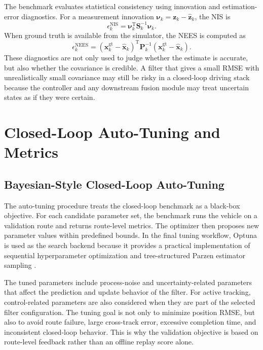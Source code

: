 \documentclass[conference]{IEEEtran}
\begin{document}
The benchmark evaluates statistical consistency using innovation and estimation-error diagnostics. For a measurement innovation $\boldsymbol{\nu}_k=\mathbf{z}_k-\hat{\mathbf{z}}_k$, the NIS is
\begin{equation}
\epsilon_k^{\mathrm{NIS}}=\boldsymbol{\nu}_k^{\mathrm{T}}\mathbf{S}_k^{-1}\boldsymbol{\nu}_k.
\label{eq:nis}
\end{equation}
When ground truth is available from the simulator, the NEES is computed as
\begin{equation}
\epsilon_k^{\mathrm{NEES}}=(\mathbf{x}_k^{\mathrm{gt}}-\hat{\mathbf{x}}_k)^{\mathrm{T}}
\mathbf{P}_k^{-1}(\mathbf{x}_k^{\mathrm{gt}}-\hat{\mathbf{x}}_k).
\label{eq:nees}
\end{equation}
These diagnostics are not only used to judge whether the estimate is accurate, but also whether the covariance is credible. A filter that gives a small RMSE with unrealistically small covariance may still be risky in a closed-loop driving stack because the controller and any downstream fusion module may treat uncertain states as if they were certain.

\section{Closed-Loop Auto-Tuning and Metrics}
\label{sec:tuning_metrics}

\subsection{Bayesian-Style Closed-Loop Auto-Tuning}

The auto-tuning procedure treats the closed-loop benchmark as a black-box objective. For each candidate parameter set, the benchmark runs the vehicle on a validation route and returns route-level metrics. The optimizer then proposes new parameter values within predefined bounds. In the final tuning workflow, Optuna is used as the search backend because it provides a practical implementation of sequential hyperparameter optimization and tree-structured Parzen estimator sampling \cite{bergstra2011algorithms,akiba2019optuna}.

The tuned parameters include process-noise and uncertainty-related parameters that affect the prediction and update behavior of the filter. For active tracking, control-related parameters are also considered when they are part of the selected filter configuration. The tuning goal is not only to minimize position RMSE, but also to avoid route failure, large cross-track error, excessive completion time, and inconsistent closed-loop behavior. This is why the validation objective is based on route-level feedback rather than an offline replay score alone.
\end{document}
